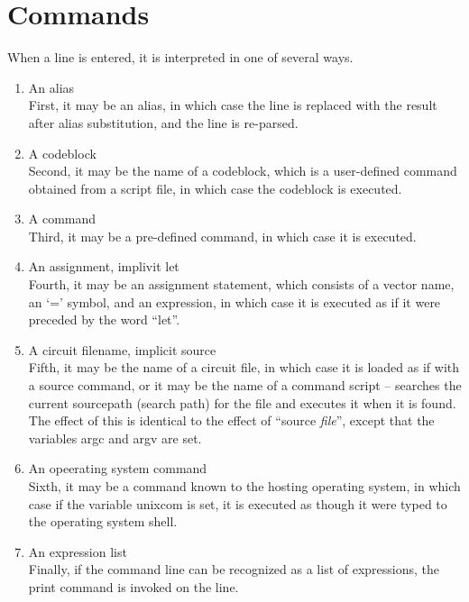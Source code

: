 \chapter{{\WRspice} Commands}
\label{commands}


When a line is entered, it is interpreted in one of several ways. 

\begin{enumerate}
\item{An alias}\\
First, it may be an alias, in which case the line is replaced with the
result after alias substitution, and the line is re-parsed.

\item{A codeblock}\\
Second, it may be the name of a codeblock, which is a user-defined
command obtained from a script file, in which case the codeblock is
executed. 

\item{A command}\\
Third, it may be a pre-defined command, in which case it is executed. 

\item{An assignment, implivit {\cb let}}\\
Fourth, it may be an assignment statement, which consists of a vector
name, an `{\vt =}' symbol, and an expression, in which case it is
executed as if it were preceded by the word ``{\vt let}''.

\item{A circuit filename, implicit {\cb source}}\\
Fifth, it may be the name of a circuit file, in which case it is
loaded as if with a {\cb source} command, or it may be the name of a
command script -- {\WRspice} searches the current {\et sourcepath}
(search path) for the file and executes it when it is found.  The
effect of this is identical to the effect of ``{\vt source} {\it
file}'', except that the variables {\et argc} and {\et argv} are set.

\item{An opeerating system command}\\
Sixth, it may be a command known to the hosting operating system, in
which case if the variable {\et unixcom} is set, it is executed as
though it were typed to the operating system shell.

\item{An expression list}\\
Finally, if the command line can be recognized as a list of
expressions, the {\cb print} command is invoked on the line.
\end{enumerate}


